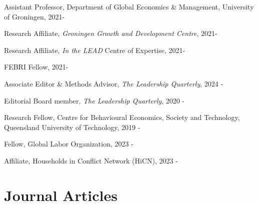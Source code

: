 \documentclass[letterpaper]{article}
\renewenvironment{itemize}{
  \begin{list}{}{
    \setlength{\leftmargin}{1.5em}
  }
}{
  \end{list}
}
\begin{document}
\begin{itemize}
	
	\item Assistant Professor, Department of Global Economics \& Management, University of Groningen, 2021-
	\begin{itemize}
	\item Research Affiliate, \textit{Groningen Growth and Development Centre}, 2021-
	\item Research Affiliate, \textit{In the LEAD} Centre of Expertise, 2021-
	\item FEBRI Fellow, 2021-
	\end{itemize}
	\item Associate Editor \& Methods Advisor, \textit{The Leadership Quarterly}, 2024 -
	\item Editorial Board member, \textit{The Leadership Quarterly}, 2020 -
	\item Research Fellow, Centre for Behavioural Economics, Society and Technology, Queensland University of Technology, 2019 -
	\item Fellow, Global Labor Organization, 2023 -
	\item Affiliate, Households in Conflict Network (HiCN), 2023 -
\end{itemize}

		
\section*{Journal Articles}
\end{document}
